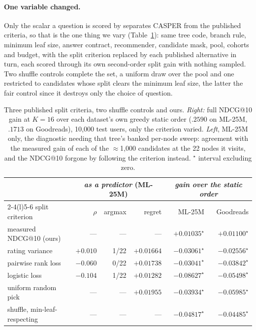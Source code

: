 \documentclass[runningheads]{llncs}
\begin{document}
\paragraph{One variable changed.}
Only the scalar a question is scored by separates CASPER from the published criteria, so that is the
one thing we vary
(Table~\ref{tab:criterion}): same tree code, branch rule, minimum leaf size, answer contract, recommender, candidate mask, pool, cohorts and budget, with the split criterion replaced by each
published alternative in turn, each scored through its own second-order split gain with nothing
sampled. Two shuffle controls
complete the set, a uniform draw over the pool and one restricted to candidates whose split clears
the minimum leaf size, the latter the fair control since it destroys only the choice of question.

\begin{table}[tbp]
\centering
\caption{Three published split criteria, two shuffle controls and ours. \emph{Right:} full NDCG@10
gain at $K{=}16$ over each dataset's own greedy static order ($.2590$ on ML-25M, $.1713$ on
Goodreads), 10{,}000 test users, only the criterion varied. \emph{Left}, ML-25M only, the diagnostic
needing that tree's banked per-node sweep: agreement with the measured gain of each of the
$\approx$1{,}000 candidates at the 22 nodes it visits, and the NDCG@10 forgone by following the
criterion instead. $^\star$ interval excluding zero.}
\label{tab:criterion}
\footnotesize
\setlength{\tabcolsep}{3pt}
\begin{tabular}{@{}l rrr rr@{}}
\toprule
 & \multicolumn{3}{c}{\emph{as a predictor} (ML-25M)} & \multicolumn{2}{c}{\emph{gain over the static order}} \\
\cmidrule(lr){2-4}\cmidrule(l){5-6}
split criterion & $\rho$ & argmax & regret & ML-25M & Goodreads \\
\midrule
measured NDCG@10 (ours) & --- & --- & --- & $+0.01035^\star$ & $+0.01100^\star$ \\
rating variance~\cite{golbandi2011adaptive} & $+0.010$ & 1/22 & $+0.01664$ & $-0.03061^\star$ & $-0.02556^\star$ \\
pairwise rank loss~\cite{hu2013interview} & $-0.060$ & 0/22 & $+0.01738$ & $-0.03041^\star$ & $-0.03842^\star$ \\
logistic loss~\cite{hu2013interview} & $-0.104$ & 1/22 & $+0.01282$ & $-0.08627^\star$ & $-0.05498^\star$ \\
\midrule
uniform random pick & --- & --- & $+0.01955$ & $-0.03934^\star$ & $-0.05985^\star$ \\
shuffle, min-leaf-respecting & --- & --- & --- & $-0.04817^\star$ & $-0.04485^\star$ \\
\bottomrule
\end{tabular}
\end{table}
\end{document}
